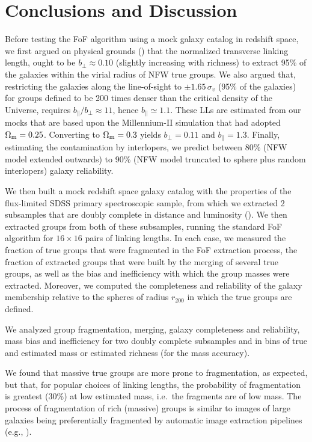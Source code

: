 \section{Conclusions and Discussion}
\label{sec:discussion}

Before testing the FoF algorithm using a mock galaxy catalog in redshift space,
we first argued on physical grounds () that the
normalized transverse linking length, ought to be $b_\perp \approx 0.10$
(slightly increasing with richness) to extract 95\% of the galaxies within the
virial radius of NFW true groups.  We also argued that, restricting the
galaxies along the line-of-sight to $\pm1.65\,\sigma_v$ (95\% of the galaxies)
for groups defined to be 200 times denser than the critical density of the
Universe, requires $b_\parallel/b_\perp \approx 11$, hence $b_\parallel \simeq
1.1$. These LLs are estimated from our mocks that are based upon the
Millennium-II simulation that had adopted $\Omega_{\rm m}=0.25$. Converting to
$\Omega_{\rm m}=0.3$ yields $b_\perp=0.11$ and $b_\parallel=1.3$. Finally,
estimating the contamination by interlopers, we predict between 80\% (NFW model
extended outwards) to 90\% (NFW model truncated to sphere plus random
interlopers) galaxy reliability.

We then built a mock redshift space galaxy catalog with the properties of the
flux-limited SDSS primary spectroscopic sample, from which we extracted 2
subsamples that are doubly complete in distance and luminosity
(). We then extracted groups from both of these
subsamples, running the standard FoF algorithm for $16\times16$ pairs of
linking lengths.  In each case, we measured the fraction of true groups that
were fragmented in the FoF extraction process, the fraction of extracted groups
that were built by the merging of several true groups, as well as the bias and
inefficiency with which the group masses were extracted. Moreover, we computed
the completeness and reliability of the galaxy membership relative to the
spheres of radius $r_{200}$ in which the true groups are defined.

We analyzed group fragmentation, merging, galaxy completeness and reliability,
mass bias and inefficiency for two doubly complete subsamples and in bins of
true and estimated mass or estimated richness (for the mass accuracy).

We found that massive true groups are more prone to fragmentation, as expected,
but that, for popular choices of linking lengths, the probability of
fragmentation is greatest (30\%) at low estimated mass, i.e.\ the fragments are
of low mass. The process of fragmentation of rich (massive) groups  is similar
to images of large galaxies being preferentially fragmented by automatic image
extraction pipelines (e.g., \citealp{DePropris+07}).


